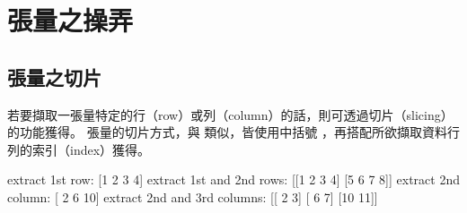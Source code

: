 \documentclass[letterpaper,10pt,english]{sphinxmanual}
\begin{document}
\section{張量之操弄}
\label{\detokenize{notebook/lab-torch-tensor:id6}}

\subsection{張量之切片}
\label{\detokenize{notebook/lab-torch-tensor:id7}}
若要擷取一張量特定的行（row）或列（column）的話，則可透過切片（slicing）的功能獲得。 張量的切片方式，與  類似，皆使用中括號 \sphinxcode{\sphinxupquote{{[}{]}}}，再搭配所欲擷取資料行列的索引（index）獲得。

\begin{sphinxVerbatim}[commandchars=\\\{\}]
      \PYG{p}{[} \PYG{p}{]}
      \PYG{p}{[} \PYG{p}{]}
      \PYG{p}{[} \PYG{p}{]}
      \PYG{p}{[} \PYG{p}{]}
\end{sphinxVerbatim}

\begin{sphinxVerbatim}[commandchars=\\\{\}]
extract 1st row: 
 [1 2 3 4]
extract 1st and 2nd rows: 
 [[1 2 3 4]
 [5 6 7 8]]
extract 2nd column: 
 [ 2  6 10]
extract 2nd and 3rd columns: 
 [[ 2  3]
 [ 6  7]
 [10 11]]
\end{sphinxVerbatim}
\end{document}
